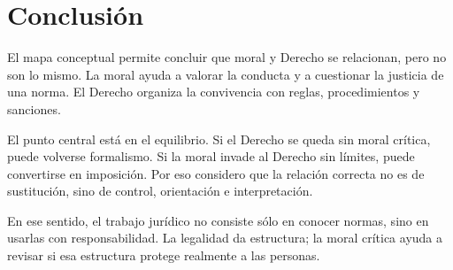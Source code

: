 \documentclass[
	spanish,
	letterpaper, oneside
]{article}
\begin{document}
\section{Conclusión}

El mapa conceptual permite concluir que moral y Derecho se relacionan, pero no son lo mismo. La moral ayuda a valorar la conducta y a cuestionar la justicia de una norma. El Derecho organiza la convivencia con reglas, procedimientos y sanciones.

El punto central está en el equilibrio. Si el Derecho se queda sin moral crítica, puede volverse formalismo. Si la moral invade al Derecho sin límites, puede convertirse en imposición. Por eso considero que la relación correcta no es de sustitución, sino de control, orientación e interpretación.

En ese sentido, el trabajo jurídico no consiste sólo en conocer normas, sino en usarlas con responsabilidad. La legalidad da estructura; la moral crítica ayuda a revisar si esa estructura protege realmente a las personas.

% 



\end{document}
